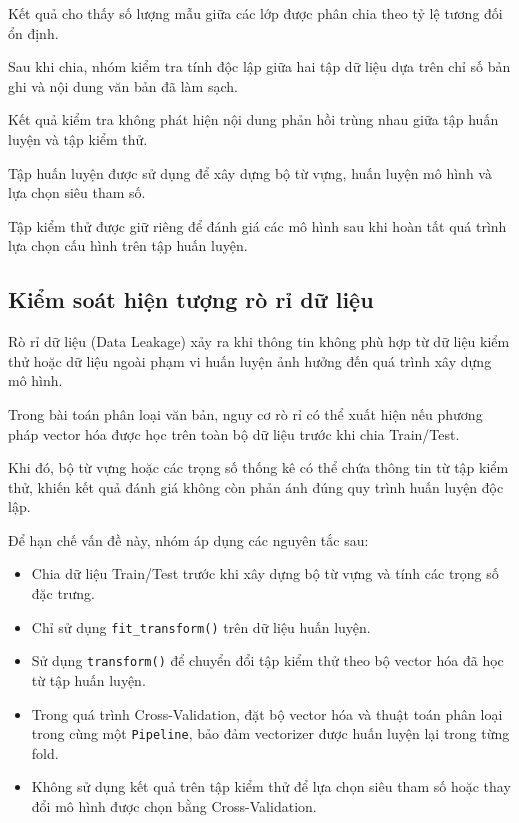Kết quả cho thấy số lượng mẫu giữa các lớp được phân chia theo tỷ lệ tương đối ổn định.

Sau khi chia, nhóm kiểm tra tính độc lập giữa hai tập dữ liệu dựa trên chỉ số bản ghi và nội dung văn bản đã làm sạch.

Kết quả kiểm tra không phát hiện nội dung phản hồi trùng nhau giữa tập huấn luyện và tập kiểm thử.

Tập huấn luyện được sử dụng để xây dựng bộ từ vựng, huấn luyện mô hình và lựa chọn siêu tham số.

Tập kiểm thử được giữ riêng để đánh giá các mô hình sau khi hoàn tất quá trình lựa chọn cấu hình trên tập huấn luyện.


\subsection{Kiểm soát hiện tượng rò rỉ dữ liệu}

Rò rỉ dữ liệu (Data Leakage) xảy ra khi thông tin không phù hợp từ dữ liệu kiểm thử hoặc dữ liệu ngoài phạm vi huấn luyện ảnh hưởng đến quá trình xây dựng mô hình.

Trong bài toán phân loại văn bản, nguy cơ rò rỉ có thể xuất hiện nếu phương pháp vector hóa được học trên toàn bộ dữ liệu trước khi chia Train/Test.

Khi đó, bộ từ vựng hoặc các trọng số thống kê có thể chứa thông tin từ tập kiểm thử, khiến kết quả đánh giá không còn phản ánh đúng quy trình huấn luyện độc lập.

Để hạn chế vấn đề này, nhóm áp dụng các nguyên tắc sau:

\begin{itemize}
    \item Chia dữ liệu Train/Test trước khi xây dựng bộ từ vựng và tính các trọng số đặc trưng.

    \item Chỉ sử dụng \texttt{fit\_transform()} trên dữ liệu huấn luyện.

    \item Sử dụng \texttt{transform()} để chuyển đổi tập kiểm thử theo bộ vector hóa đã học từ tập huấn luyện.

    \item Trong quá trình Cross-Validation, đặt bộ vector hóa và thuật toán phân loại trong cùng một \texttt{Pipeline}, bảo đảm vectorizer được huấn luyện lại trong từng fold.

    \item Không sử dụng kết quả trên tập kiểm thử để lựa chọn siêu tham số hoặc thay đổi mô hình được chọn bằng Cross-Validation.
\end{itemize}

